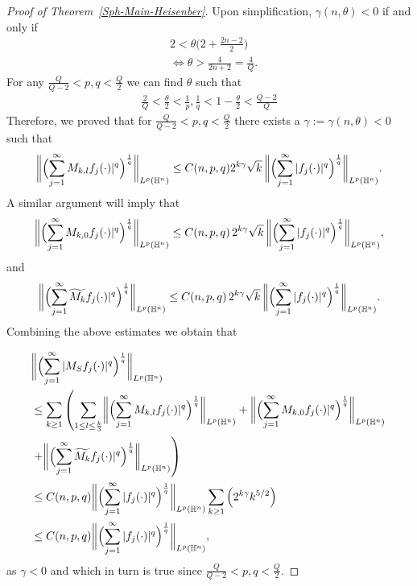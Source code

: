 \documentclass[11pt]{amsart}
\newcommand{\Ha}{\mathbb{H}^n}
\theoremstyle{definition}
\numberwithin{equation}{section}
\begin{document}
\begin{proof}[Proof of Theorem~\ref{Sph-Main-Heisenber}]
Upon simplification, $\gamma(n, \theta)<0$ if and only if 
\begin{align*}
&2<\theta \bigg(2+\frac{2n-2}{2}\bigg)\\
&\iff \theta>\frac{4}{2n+2}=\frac{4}{Q}.
\end{align*}
 For any $\frac{Q}{Q-2}<p, q<\frac{Q}{2}$ we can find $\theta$ such that 
 \begin{align}
 \nonumber \frac{2}{Q}<\frac{\theta}{2}<\frac{1}{p}, \frac{1}{q}<1-\frac{\theta}{2}<\frac{Q-2}{Q} 
 \end{align}
 Therefore, we proved that for $\frac{Q}{Q-2}<p, q<\frac{Q}{2}$ there exists a $\gamma:=\gamma(n, \theta)<0$ such that 
\begin{align}
\label{FS1}
\biggl\|\Bigl(\sum_{j=1}^{\infty}{M_{k, l}} f_j(\cdot)|^q\Bigr)^\frac{1}{q}\biggr\|_{L^p(\Ha)}\leq C({n, p, q}) 2^{k\gamma} \sqrt{k} \, \biggl\|\Bigl(\sum_{j=1}^{\infty} |f_j(\cdot)|^q\Bigr)^\frac{1}{q}\biggr\|_{L^p(\Ha)}.    
\end{align} 
A similar argument will imply that
\begin{align}
\label{FS2}
\biggl\|\Bigl(\sum_{j=1}^{\infty}{M_{k, 0}} f_j(\cdot)|^q\Bigr)^\frac{1}{q}\biggr\|_{L^p(\Ha)}\leq C({n, p, q})\, 2^{k\gamma} \sqrt{k} \, \biggl\|\Bigl(\sum_{j=1}^{\infty} |f_j(\cdot)|^q\Bigr)^\frac{1}{q}\biggr\|_{L^p(\Ha)},    
\end{align} 
and 
\begin{align}
\label{FS3}
\biggl\|\Bigl(\sum_{j=1}^{\infty}\widetilde{M_{k}}f_j(\cdot)|^q\Bigr)^\frac{1}{q}\biggr\|_{L^p(\Ha)}\leq C({n, p, q})\, 2^{k\gamma} \sqrt{k} \, \biggl\|\Bigl(\sum_{j=1}^{\infty} |f_j(\cdot)|^q\Bigr)^\frac{1}{q}\biggr\|_{L^p(\Ha)}.    
\end{align} 
Combining the above estimates we obtain that

\begin{align}
\nonumber&\biggl\|\Bigl(\sum_{j=1}^{\infty}|M_{S}f_j(\cdot)|^q\Bigr)^\frac{1}{q}\biggr\|_{L^p(\Ha)}\\
\nonumber&\leq \sum_{k\geq 1} \left(\sum_{1\leq l\leq \frac{k}{3}}\biggl\|\Bigl(\sum_{j=1}^{\infty}{M_{k, l}} f_j(\cdot)|^q\Bigr)^\frac{1}{q}\biggr\|_{L^p(\Ha)}+\biggl\|\Bigl(\sum_{j=1}^{\infty}{M_{k, 0}} f_j(\cdot)|^q\Bigr)^\frac{1}{q}\biggr\|_{L^p(\Ha)}\right.\\
\nonumber &\left.+\biggl\|\Bigl(\sum_{j=1}^{\infty}\widetilde{M_{k}}f_j(\cdot)|^q\Bigr)^\frac{1}{q}\biggr\|_{L^p(\Ha)}\right)\\
\nonumber&\leq C(n, p, q)  \biggl\|\Bigl(\sum_{j=1}^{\infty}|f_j(\cdot)|^q\Bigr)^\frac{1}{q}\biggr\|_{L^p(\Ha)} \sum_{k\geq 1}\left(2^{k\gamma}k^{5/2}\right)\\
&\nonumber\leq C(n, p,q) \biggl\|\Bigl(\sum_{j=1}^{\infty}|f_j(\cdot)|^q\Bigr)^\frac{1}{q}\biggr\|_{L^p(\Ha)},   
\end{align}
as $\gamma<0$ and which in turn is true since $\frac{Q}{Q-2}<p, q<\frac{Q}{2}.$


\end{proof}
\end{document}
